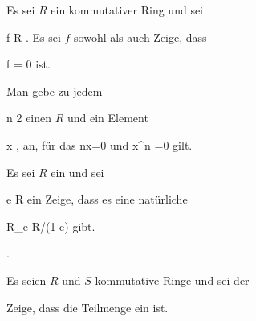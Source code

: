 {}
{





Es sei $R$ ein kommutativer Ring und sei

\mavergleichskette
{\vergleichskette
{ f
}
{ \in }{ R
}
{  }{
}
{    }{
}
{   }{
}
}
{}{}{.}
Es sei $f$ sowohl
als auch
Zeige, dass

\mavergleichskette
{\vergleichskette
{ f
}
{ = }{ 0
}
{  }{
}
{    }{
}
{   }{
}
}
{}{}{}
ist.





}
{} {}

{}
{





Man gebe zu jedem

\mavergleichskette
{\vergleichskette
{ n
}
{ \geq }{ 2
}
{  }{
}
{    }{
}
{   }{
}
}
{}{}{}
einen
$R$ und ein Element

 {}
 {x } {}
 {} {} {} {,}
an, für das
\mathkor {} {nx=0} {und} {x^n =0} {}
gilt.





}
{} {}

{}
{





Es sei $R$ ein
und sei

\mavergleichskette
{\vergleichskette
{e
}
{ \in }{ R
}
{  }{
}
{    }{
}
{   }{
}
}
{}{}{}
ein
Zeige, dass es eine natürliche

\mavergleichskettedisp
{\vergleichskette
{ R_e
}
{ \cong} { R/(1-e)
}
{ } {
}
{ } {
}
{ } {
}
}
{}{}{}
gibt.





}
{ {} {.}} {}

{}
{





Es seien $R$ und $S$ kommutative Ringe und sei
 der 

 Zeige, dass die Teilmenge
 ein 
ist.





}
{} {}

